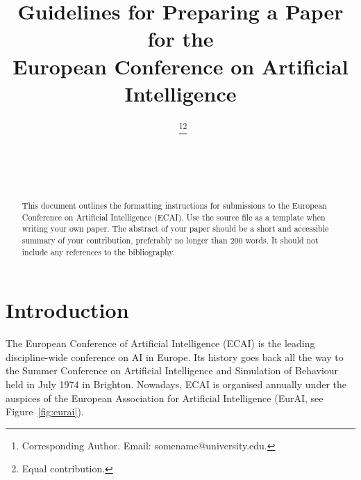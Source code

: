 \documentclass{ecai}
\begin{document}

\begin{frontmatter}




\title{Guidelines for Preparing a Paper for the \\
European Conference on Artificial Intelligence}


\author[A]{~\thanks{Corresponding Author. Email: somename@university.edu.}\footnote{Equal contribution.}}
\author[B]{~\footnotemark}
\author[B,C]{~} 

\address[A]{Short Affiliation of First Author}
\address[B]{Short Affiliation of Second Author and Third Author}
\address[C]{Short Affiliation of Third Author}

\begin{abstract}
This document outlines the formatting instructions for submissions to 
the European Conference on Artificial Intelligence (ECAI). 
Use the source file as a template when writing your own paper. 
The abstract of your paper should be a short and accessible summary 
of your contribution, preferably no longer than 200 words. 
It should not include any references to the bibliography.
\end{abstract}

\end{frontmatter}


\section{Introduction}

The European Conference of Artificial Intelligence (ECAI) is the leading 
discipline-wide conference on AI in Europe. Its history goes back all 
the way to the Summer Conference on Artificial Intelligence and 
Simulation of Behaviour held in July 1974 in Brighton. Nowadays, ECAI is 
organised annually under the auspices of the European Association for 
Artificial Intelligence (EurAI, see Figure~\ref{fig:eurai}).
\end{document}
